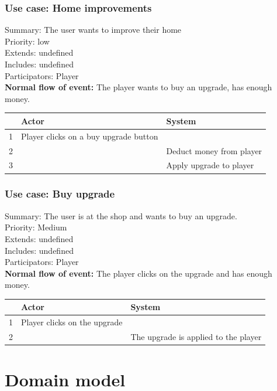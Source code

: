 \documentclass{article}
\begin{document}
\subsubsection{Use case: Home improvements}
Summary: The user wants to improve their home\\
Priority: low \\
Extends: undefined\\
Includes: undefined\\
Participators: Player\\
\textbf{Normal flow of event:} The player wants to buy an upgrade, has enough money.
\vspace{1 mm}\\
\begin{tabular}{|c|l|l|} \hline
      & Actor & System \\ \hline
    1 & Player clicks on a buy upgrade button & \\ \hline
    2 & & Deduct money from player \\ \hline
    3 & & Apply upgrade to player \\ \hline
\end{tabular}  
\vspace{5 mm}
\subsubsection{Use case: Buy upgrade}
Summary: The user is at the shop and wants to buy an upgrade.\\
Priority: Medium\\
Extends: undefined\\
Includes: undefined\\
Participators: Player\\
\textbf{Normal flow of event:} The player clicks on the upgrade and has enough money.
\vspace{1 mm}\\
\begin{tabular}{|c|l|l|} \hline
      & Actor & System \\ \hline
    1 & Player clicks on the upgrade & \\ \hline
    2 & & The upgrade is applied to the player \\ \hline
\end{tabular}

\section{Domain model}
\end{document}
